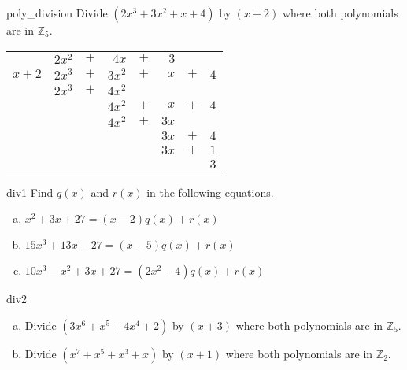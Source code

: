 \begin{example}{poly_division} 
Divide $(2x^3+3x^2+x+4)$ by $(x+2)$ where  both polynomials are in $\mathbb{Z}_5$.
\begin{center}
\begin{tabular}{rrcrcrcr}
        &  $2x^2$  &  $+$  &      $4x$  &  $+$  &    $3$  &       &       \\ \cline{2-8}
 \multicolumn{1}{r|}{$x + 2$}
        &  $2x^3$  &  $+$  &    $3x^2$  &  $+$  & $ x$  &  $+$  &  $4$  \\
        &  $2x^3$  &  $+$  &    $4 x^2$  &       &         &       &       \\ \cline{2-8}
        &         &       &                $4x^2$  & $+$  &  $ x$  &  $+$  &  $4$  \\
        &         &       &                $4x^2$  &  $+$  & $ 3x$  &       &       \\ \cline{4-8}
        &         &       &           &       &                         $3 x$  & $+$  & $4$  \\
        &         &       &           &       &                          $3x$  & $+$  & $1$  \\ \cline{6-8}
        &         &       &           &       &         &       &                               $3$
\end{tabular}
\end{center}
\end{example}


\begin {exercise}{div1}
Find $q(x)$ and $r(x)$ in the following equations.
\begin {enumerate} [(a)]
\item $x^2+3x+27=(x-2)q(x) + r(x)$
\item $15x^3+13x-27=(x-5)q(x) + r(x)$
\item $10x^3 - x^2+3x+27=(2x^2-4)q(x) + r(x)$
\end {enumerate}
\end {exercise}

\begin {exercise}{div2}
\begin {enumerate} [(a)]
\item Divide  $ ( 3x^6 + x^5 +4x^4 +2)$  by $ ( x+3) $ where both polynomials are in  $\mathbb{Z}_5$.
\item Divide $ (x^7 + x^5 + x^3 + x)$  by $ ( x + 1 ) $ where both polynomials are in $ \mathbb{Z}_2$.
\end {enumerate}
\end {exercise}


